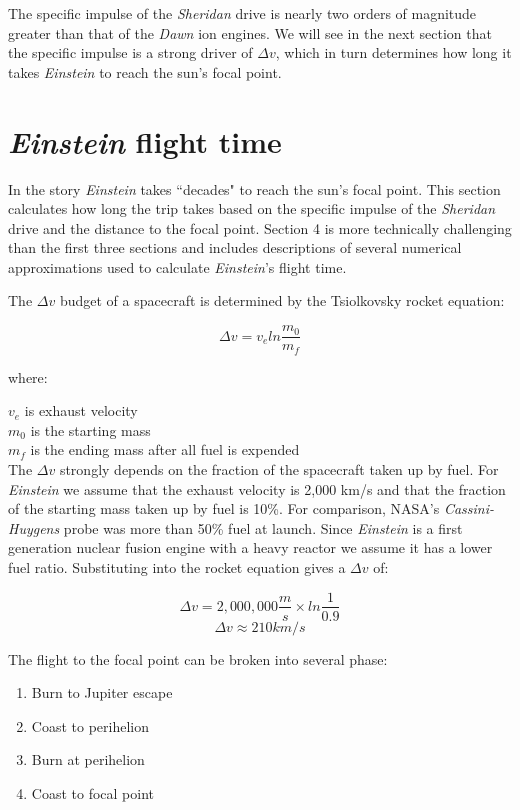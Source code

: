 \documentclass[12pt]{article} %
\begin{document}
The specific impulse of the \textit{Sheridan} drive is nearly two orders of magnitude greater than that of the \textit{Dawn} ion engines. We will see in the next section that the specific impulse is a strong driver of $\Delta v$, which in turn determines how long it takes \textit{Einstein} to reach the sun's focal point.

\section{\textit{Einstein} flight time}
In the story \textit{Einstein} takes ``decades" to reach the sun's focal point. This section calculates how long the trip takes based on the specific impulse of the \textit{Sheridan} drive and the distance to the focal point. Section 4 is more technically challenging than the first three sections and includes descriptions of several numerical approximations used to calculate \textit{Einstein}'s flight time.

The $\Delta v$ budget of a spacecraft is determined by the Tsiolkovsky rocket equation:

$$\Delta v = v_e ln \frac{m_0}{m_f}$$

where:

$v_e$ is exhaust velocity\\
$m_0$ is the starting mass\\
$m_f$ is the ending mass after all fuel is expended\\

The $\Delta v$ strongly depends on the fraction of the spacecraft taken up by fuel. For \textit{Einstein} we assume that the exhaust velocity is 2,000 km/s and that the fraction of the starting mass taken up by fuel is 10\%. For comparison, NASA's \textit{Cassini-Huygens} probe was more than 50\% fuel at launch. Since \textit{Einstein} is a first generation nuclear fusion engine with a heavy reactor we assume it has a lower fuel ratio. Substituting into the rocket equation gives a $\Delta v$ of:

$$\Delta v = 2,000,000\frac{m}{s} \times ln \frac{1}{0.9}$$
$$\Delta v \approx 210 km/s$$ 

The flight to the focal point can be broken into several phase:
\begin{enumerate}
\item Burn to Jupiter escape
\item Coast to perihelion
\item Burn at perihelion
\item Coast to focal point
\end{enumerate}
\end{document}
